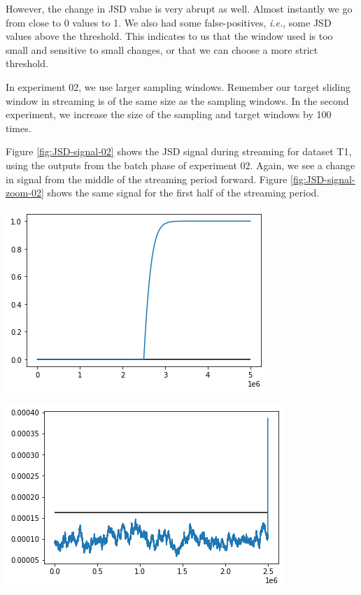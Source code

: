 However, the change in JSD value is very abrupt as well. Almost instantly we go from close to 0 values to 1. We also had some false-positives, \textit{i.e.}, some JSD values above the threshold. This indicates to us that the window used is too small and sensitive to small changes, or that we can choose a more strict threshold.

In experiment 02, we use larger sampling windows. Remember our target sliding window in streaming is of the same size as the sampling windows. In the second experiment, we increase the size of the sampling and target windows by 100 times.

Figure \ref{fig:JSD-signal-02} shows the JSD signal during streaming for dataset T1, using the outputs from the batch phase of experiment 02. Again, we see a change in signal from the middle of the streaming period forward. Figure \ref{fig:JSD-signal-zoom-02} shows the same signal for the first half of the streaming period.
\begin{center}
\begin{minipage}{.5\textwidth}
  \centering
  \includegraphics[width=1\linewidth]{figures/stream-analysis-viz-62500.png}
  \label{fig:JSD-signal-02}
\end{minipage}%
\begin{minipage}{.5\textwidth}
  \centering
  \includegraphics[width=1\linewidth]{figures/stream-analysis-viz-zoom-62500.png}
  \label{fig:JSD-signal-zoom-02}
\end{minipage}
\end{center}
